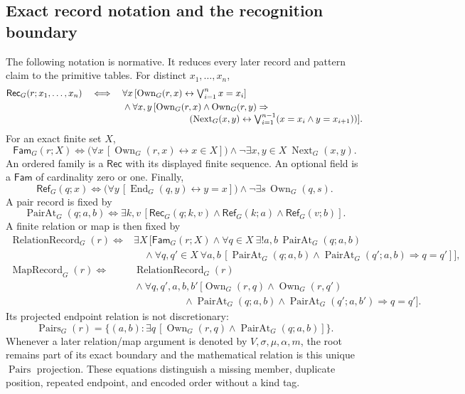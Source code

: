 \documentclass[11pt,twoside]{article}
\newcommand{\Rec}{\mathsf{Rec}}
\newcommand{\Fam}{\mathsf{Fam}}
\newcommand{\RefPos}{\mathsf{Ref}}
\begin{document}
\subsection*{Exact record notation and the recognition boundary}

The following notation is normative.  It reduces every later record and pattern
claim to the primitive tables.  For distinct \(x_1,\ldots,x_n\),
\[
\begin{split}
 \Rec_G(r;x_1,\ldots,x_n)\quad\Longleftrightarrow\quad{}
 &\forall x\,[\operatorname{Own}_G(r,x)
             \leftrightarrow \textstyle\bigvee_{i=1}^{n}x=x_i]\\
 &{}\land
 \forall x,y\,[\operatorname{Own}_G(r,x)\land
                \operatorname{Own}_G(r,y)\Rightarrow\\[-0.4em]
 &\hspace{7.3em}(\operatorname{Next}_G(x,y)
      \leftrightarrow
      \textstyle\bigvee_{i=1}^{n-1}(x=x_i\land y=x_{i+1}))].
\end{split}
\]
For an exact finite set \(X\),
\[
 \Fam_G(r;X)\Longleftrightarrow
 \bigl(\forall x\,[\operatorname{Own}_G(r,x)\leftrightarrow x\in X]\bigr)
 \land\neg\exists x,y\in X\ \operatorname{Next}_G(x,y).
\]
An ordered family is a \(\Rec\) with its displayed finite sequence.  An optional
field is a \(\Fam\) of cardinality zero or one.  Finally,
\[
 \RefPos_G(q;x)\Longleftrightarrow
 \bigl(\forall y\,[\operatorname{End}_G(q,y)\leftrightarrow y=x]\bigr)
 \land\neg\exists s\,\operatorname{Own}_G(q,s).
\]
A pair record is fixed by
\[
 \operatorname{PairAt}_G(q;a,b)\Longleftrightarrow
 \exists k,v\,[\Rec_G(q;k,v)\land\RefPos_G(k;a)
                         \land\RefPos_G(v;b)].
\]
A finite relation or map is then fixed by
\[
\begin{split}
 \operatorname{RelationRecord}_G(r)\Longleftrightarrow{}&
 \exists X\,[\Fam_G(r;X)
   \land\forall q\in X\ \exists!a,b\,\operatorname{PairAt}_G(q;a,b)\\[-0.3em]
 &\quad{}\land\forall q,q'\in X\ \forall a,b\,[
   \operatorname{PairAt}_G(q;a,b)\land
   \operatorname{PairAt}_G(q';a,b)\Rightarrow q=q']],\\
 \operatorname{MapRecord}_G(r)\Longleftrightarrow{}&
 \operatorname{RelationRecord}_G(r)\\[-0.3em]
 &{}\land\forall q,q',a,b,b'\,[
   \operatorname{Own}_G(r,q)\land\operatorname{Own}_G(r,q')\\[-0.3em]
 &\hspace{5em}{}\land\operatorname{PairAt}_G(q;a,b)
   \land\operatorname{PairAt}_G(q';a,b')\Rightarrow q=q'].
\end{split}
\]
Its projected endpoint relation is not discretionary:
\[
 \operatorname{Pairs}_G(r)=
 \{(a,b):\exists q\,[\operatorname{Own}_G(r,q)
                   \land\operatorname{PairAt}_G(q;a,b)]\}.
\]
Whenever a later relation/map argument is denoted by \(V,\sigma,\mu,\alpha,m\),
the root remains part of its exact boundary and the mathematical relation is this
unique \(\operatorname{Pairs}\) projection.  These equations distinguish a
missing member, duplicate position, repeated endpoint, and encoded order without
a kind tag.
\end{document}
